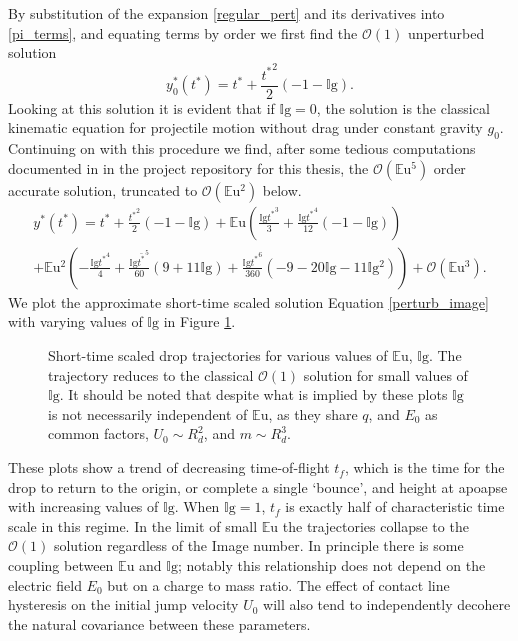\documentclass[12pt,a4paper,oneside]{book}
\begin{document}
By substitution of the expansion  \ref{regular_pert} and its derivatives into \ref{pi_terms}, and equating terms by order we first find the $\mathcal{O}(1)$ unperturbed solution
\[{y^*_{0}}{\left ({t^*} \right )} = {t^*} + \frac{{t^*}^{2}}{2} \left(-1 - \mathbb{I}\mbox{g}\right). \]
Looking at this solution it is evident that if $\mathbb{I}\mbox{g}=0$, the solution is the classical kinematic equation for projectile motion without drag under constant gravity $g_0$. Continuing on with this procedure we find, after some tedious computations documented in in the project repository for this thesis\cite{schmidt_droplet_electro-bounce:_2017}, the $\mathcal{O}(\mathbb{E}\mbox{u}^5)$ order accurate solution, truncated to $\mathcal{O}(\mathbb{E}\mbox{u}^2)$ below.
\begin{eqnarray}
\label{perturb_image}
&{y^*}({t^*}) = {t^*} + \frac{{t^*}^{2}}{2} \left(-1 - \mathbb{I}\mbox{g}\right) + \mathbb{E}\mbox{u} \left(\frac{\mathbb{I}\mbox{g} {t^*}^{3}}{3} + \frac{\mathbb{I}\mbox{g} {t^*}^{4}}{12} \left(-1 - \mathbb{I}\mbox{g} \right)\right)& \\
&+ \mathbb{E}\mbox{u}^{2} \left(- \frac{\mathbb{I}\mbox{g} {t^*}^{4}}{4} + \frac{\mathbb{I}\mbox{g} \bar{t^*}^{5}}{60} \left(9 + 11 \mathbb{I}\mbox{g} \right) + \frac{\mathbb{I}\mbox{g} {t^*}^{6}}{360} \left(-9 - 20 \mathbb{I}\mbox{g} - 11 \mathbb{I}\mbox{g}^{2}\right)\right) + \mathcal{O}(\mathbb{E}\mbox{u}^3).&\nonumber
\end{eqnarray}
We plot the approximate short-time scaled solution Equation \ref{perturb_image} with varying values of $\mathbb{I}\mbox{g}$ in Figure \ref{fig:short_times}.
\begin{figure}[htb]
    \centering
    \resizebox{1\textwidth}{!}{}
    \caption{Short-time scaled drop trajectories for various values of $\mathbb{E}\mbox{u}$, $\mathbb{I}\mbox{g}$. The trajectory reduces to the classical $\mathcal{O}(1)$ solution for small values of $\mathbb{I}\mbox{g}$. It should be noted that despite what is implied by these plots $\mathbb{I}\mbox{g}$ is not necessarily independent of $\mathbb{E}\mbox{u}$, as they share $q$, and $E_0$ as common factors, $U_0 \sim R_d^2$, and $m \sim R_d^3$.}
    \label{fig:short_times}
\end{figure}
These plots show a trend of decreasing time-of-flight $t_f$, which is the time for the drop to return to the origin, or complete a single `bounce', and height at apoapse with increasing values of $\mathbb{I}\mbox{g}$. When $\mathbb{I}\mbox{g} = 1$, $t_f$ is exactly half of characteristic time scale in this regime. In the limit of small $\mathbb{E}\mbox{u}$ the trajectories collapse to the $\mathcal{O}(1)$ solution regardless of the Image number. In principle there is some coupling between $\mathbb{E}\mbox{u}$ and $\mathbb{I}\mbox{g}$; notably this relationship does not depend on the electric field $E_0$ but on a charge to mass ratio. The effect of contact line hysteresis on the initial jump velocity $U_0$ will also tend to independently decohere the natural covariance between these parameters.
\end{document}
